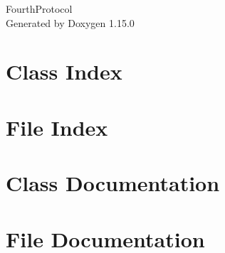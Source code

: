 \documentclass[twoside]{book}
\newcommand{\+}{\discretionary{\mbox{\scriptsize$\hookleftarrow$}}{}{}}
\newcommand{\clearemptydoublepage}{%
    \newpage{\pagestyle{empty}\cleardoublepage}%
  }
\begin{document}
  \raggedbottom
    \hypersetup{pageanchor=false,
                bookmarksnumbered=true,
                pdfencoding=unicode
               }
  \begin{titlepage}
  \vspace*{7cm}
  \begin{center}%
  {\Large Fourth\+Protocol}\\
  \vspace*{1cm}
  {\large Generated by Doxygen 1.15.0}\\
  \end{center}
  \end{titlepage}
  \clearemptydoublepage
  \tableofcontents
  \clearemptydoublepage
  \hypersetup{pageanchor=true}
\chapter{Class Index}

\chapter{File Index}

\chapter{Class Documentation}











\chapter{File Documentation}










  \backmatter
  \newpage
  \clearemptydoublepage
  \printindex
\end{document}
